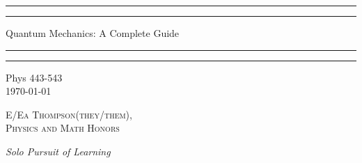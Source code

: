 \documentclass[12pt, a4paper, oneside, openright, titlepage]{book}
\begin{document}

\begin{titlepage}
    \centering
    \scshape
    \vspace*{\baselineskip}
    \rule{\textwidth}{1.6pt}\vspace*{-\baselineskip}\vspace*{2pt}
    \rule{\textwidth}{0.4pt}
    
    \vspace{0.75\baselineskip}
    
    {\LARGE Quantum Mechanics: A Complete Guide}
    
    \vspace{0.75\baselineskip}
    
    \rule{\textwidth}{0.4pt}\vspace*{-\baselineskip}\vspace{3.2pt}
    \rule{\textwidth}{1.6pt}
    
    \vspace{2\baselineskip}
    Phys 443-543 \\
    \vspace*{3\baselineskip}
    \monthdayyeardate\today \\
    \vspace*{5.0\baselineskip}
    
    {\scshape\Large E/Ea Thompson(they/them), \\ Physics and Math Honors\\}
    
    \vspace{1.0\baselineskip}
    \textit{Solo Pursuit of Learning}
    \vfill
    \enlargethispage{1in}
    \begin{figure}[b!]
    \end{figure}
\end{titlepage}
\end{document}
